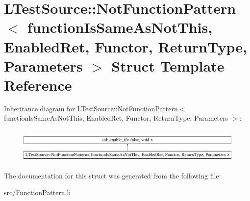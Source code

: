 \hypertarget{struct_l_test_source_1_1_not_function_pattern}{\section{L\-Test\-Source\-:\-:Not\-Function\-Pattern$<$ function\-Is\-Same\-As\-Not\-This, Enabled\-Ret, Functor, Return\-Type, Parameters $>$ Struct Template Reference}
\label{struct_l_test_source_1_1_not_function_pattern}
}
Inheritance diagram for L\-Test\-Source\-:\-:Not\-Function\-Pattern$<$ function\-Is\-Same\-As\-Not\-This, Enabled\-Ret, Functor, Return\-Type, Parameters $>$\-:\begin{figure}[H]
\begin{center}
\leavevmode
\includegraphics[height=1.739130cm]{struct_l_test_source_1_1_not_function_pattern}
\end{center}
\end{figure}


The documentation for this struct was generated from the following file\-:\begin{DoxyCompactItemize}
\item 
src/Function\-Pattern.\-h\end{DoxyCompactItemize}
